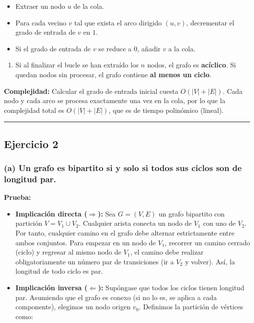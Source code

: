 \documentclass[12pt]{book} %
\providecommand{\tightlist}{%
  \setlength{\itemsep}{0pt}\setlength{\parskip}{0pt}}
\begin{document}
\begin{itemize}
\tightlist
\item
  Extraer un nodo \(u\) de la cola.
\item
  Para cada vecino \(v\) tal que exista el arco dirigido \((u, v)\),
  decrementar el grado de entrada de \(v\) en \(1\).
\item
  Si el grado de entrada de \(v\) se reduce a \(0\), añadir \(v\) a la
  cola.
\end{itemize}

\begin{enumerate}
\def\labelenumi{\arabic{enumi}.}
\setcounter{enumi}{3}
\tightlist
\item
  Si al finalizar el bucle se han extraído los \(n\) nodos, el grafo es
  \textbf{acíclico}. Si quedan nodos sin procesar, el grafo contiene
  \textbf{al menos un ciclo}.
\end{enumerate}

\textbf{Complejidad:} Calcular el grado de entrada inicial cuesta
\(O(|V|+|E|)\). Cada nodo y cada arco se procesa exactamente una vez en
la cola, por lo que la complejidad total es \textbf{\(O(|V| + |E|)\)},
que es de tiempo polinómico (lineal).

\begin{center}\rule{0.5\linewidth}{0.5pt}\end{center}

\hypertarget{ejercicio-2-1}{%
\subsection{Ejercicio 2}\label{ejercicio-2-1}}

\hypertarget{a-un-grafo-es-bipartito-si-y-solo-si-todos-sus-ciclos-son-de-longitud-par.}{%
\subsubsection{(a) Un grafo es bipartito si y solo si todos sus ciclos
son de longitud
par.}\label{a-un-grafo-es-bipartito-si-y-solo-si-todos-sus-ciclos-son-de-longitud-par.}}

\textbf{Prueba:}

\begin{itemize}
\tightlist
\item
  \textbf{Implicación directa (\(\Rightarrow\)):} Sea \(G=(V,E)\) un
  grafo bipartito con partición \(V = V_1 \cup V_2\). Cualquier arista
  conecta un nodo de \(V_1\) con uno de \(V_2\). Por tanto, cualquier
  camino en el grafo debe alternar estrictamente entre ambos conjuntos.
  Para empezar en un nodo de \(V_1\), recorrer un camino cerrado (ciclo)
  y regresar al mismo nodo de \(V_1\), el camino debe realizar
  obligatoriamente un número par de transiciones (ir a \(V_2\) y
  volver). Así, la longitud de todo ciclo es par.
\item
  \textbf{Implicación inversa (\(\Leftarrow\)):} Supóngase que todos los
  ciclos tienen longitud par. Asumiendo que el grafo es conexo (si no lo
  es, se aplica a cada componente), elegimos un nodo origen \(v_0\).
  Definimos la partición de vértices como:
\end{itemize}
\end{document}

